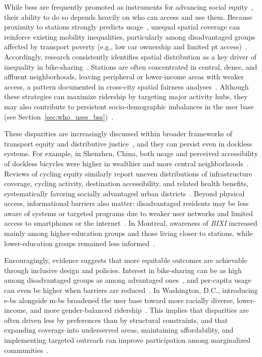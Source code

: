 While \acp{bss} are frequently promoted as instruments for advancing social equity~\cite{Shaheen2010}, their ability to do so depends heavily on who can access and use them. Because proximity to stations strongly predicts usage~\cite{Kabra2018, BachandMarleau2012}, unequal spatial coverage can reinforce existing mobility inequalities, particularly among disadvantaged groups affected by transport poverty (e.g., low car ownership and limited \ac{pt} access)~\cite{Lucas2016}. Accordingly, research consistently identifies spatial distribution as a key driver of inequality in bike-sharing~\cite{Teixeira2021, Goodman2014, Ogilvie2012}. Stations are often concentrated in central, dense, and affluent neighborhoods, leaving peripheral or lower-income areas with weaker access, a pattern documented in cross-city spatial fairness analyses~\cite{DuranRodas2020}. Although these strategies can maximize ridership by targeting major activity hubs, they may also contribute to persistent socio-demographic imbalances in the user base (see Section~\ref{sec:who_uses_bss})~\cite{Ogilvie2012, Woodcock2014, Ricci2015}.

These disparities are increasingly discussed within broader frameworks of transport equity and distributive justice~\cite{Cook2019, Litman2017, Pereira2017, Sheller2018}, and they can persist even in dockless systems. For example, in Shenzhen, China, both usage and perceived accessibility of dockless bicycles were higher in wealthier and more central neighborhoods~\cite{Zhou2024}. Reviews of cycling equity similarly report uneven distributions of infrastructure coverage, cycling activity, destination accessibility, and related health benefits, systematically favoring socially advantaged urban districts~\cite{Cunha2023}. Beyond physical access, informational barriers also matter: disadvantaged residents may be less aware of systems or targeted programs due to weaker user networks and limited access to smartphones or the internet~\cite{McNeil2018}. In Montreal, awareness of \textit{BIXI} increased mainly among higher-education groups and those living closer to stations, while lower-education groups remained less informed~\cite{Bernatchez2015}.

Encouragingly, evidence suggests that more equitable outcomes are achievable through inclusive design and policies. Interest in bike-sharing can be as high among disadvantaged groups as among advantaged ones~\cite{McNeil2018}, and per-capita usage can even be higher when barriers are reduced~\cite{Ogilvie2012}. In Washington, D.C., introducing \acp{e-b} alongside \acp{m-b} broadened the user base toward more racially diverse, lower-income, and more gender-balanced ridership~\cite{Bonilla-Alicea2020}. This implies that disparities are often driven less by preferences than by structural constraints, and that expanding coverage into underserved areas, maintaining affordability, and implementing targeted outreach can improve participation among marginalized communities~\cite{Goodman2014, McNeil2018, Ogilvie2012, Ursaki2015}.
